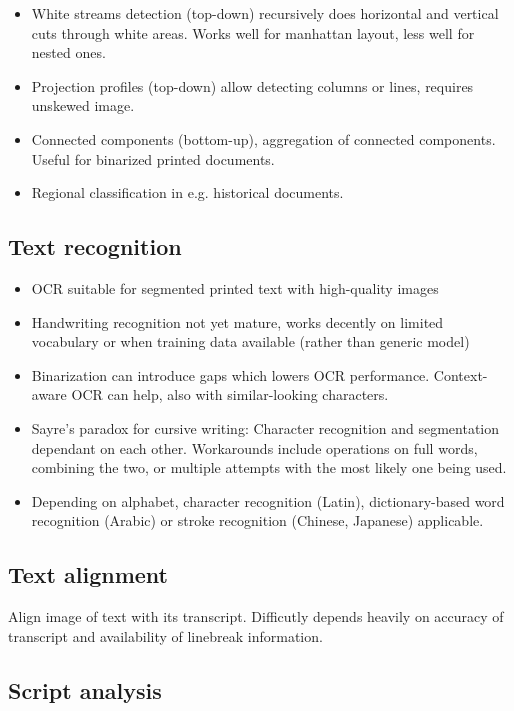 \begin{itemize}
		\item White streams detection (top-down) recursively does horizontal and vertical
				cuts through white areas. Works well for manhattan layout, less
				well for nested ones.
		\item Projection profiles (top-down) allow detecting columns or lines, requires
				unskewed image.
		\item Connected components (bottom-up), aggregation of connected
				components. Useful for binarized printed documents.
		\item Regional classification in e.g. historical documents.
\end{itemize}

\subsection{Text recognition}

\begin{itemize}
		\item OCR suitable for segmented printed text with high-quality images
		\item Handwriting recognition not yet mature, works decently on limited
				vocabulary or when training data available (rather than generic
				model)
		\item Binarization can introduce gaps which lowers OCR performance.
				Context-aware OCR can help, also with similar-looking
				characters.
		\item Sayre's paradox for cursive writing: Character recognition and
				segmentation dependant on each other. Workarounds include
				operations on full words, combining the two, or multiple
				attempts with the most likely one being used.
		\item Depending on alphabet, character recognition (Latin),
				dictionary-based word recognition (Arabic) or stroke
				recognition (Chinese, Japanese) applicable.
\end{itemize}

\subsection{Text alignment}

Align image of text with its transcript. Difficutly depends heavily on accuracy
of transcript and availability of linebreak information.

\subsection{Script analysis}

